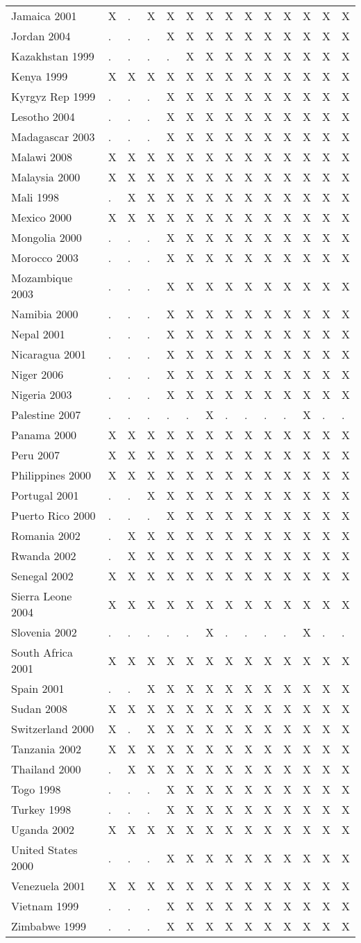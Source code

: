 \documentclass[a4paper]{article}
\begin{document}
\begin{longtable}{llllllllllllll}
Jamaica 2001&X&.&X&X&X&X&X&X&X&X&X&X&X\tabularnewline
Jordan 2004&.&.&.&X&X&X&X&X&X&X&X&X&X\tabularnewline
Kazakhstan 1999&.&.&.&.&X&X&X&X&X&X&X&X&X\tabularnewline
Kenya 1999&X&X&X&X&X&X&X&X&X&X&X&X&X\tabularnewline
Kyrgyz Rep 1999&.&.&.&X&X&X&X&X&X&X&X&X&X\tabularnewline
Lesotho 2004&.&.&.&X&X&X&X&X&X&X&X&X&X\tabularnewline
Madagascar 2003&.&.&.&X&X&X&X&X&X&X&X&X&X\tabularnewline
Malawi 2008&X&X&X&X&X&X&X&X&X&X&X&X&X\tabularnewline
Malaysia 2000&X&X&X&X&X&X&X&X&X&X&X&X&X\tabularnewline
Mali 1998&.&X&X&X&X&X&X&X&X&X&X&X&X\tabularnewline
\newpage
Mexico 2000&X&X&X&X&X&X&X&X&X&X&X&X&X\tabularnewline
Mongolia 2000&.&.&.&X&X&X&X&X&X&X&X&X&X\tabularnewline
Morocco 2003&.&.&.&X&X&X&X&X&X&X&X&X&X\tabularnewline
Mozambique 2003&.&.&.&X&X&X&X&X&X&X&X&X&X\tabularnewline
Namibia 2000&.&.&.&X&X&X&X&X&X&X&X&X&X\tabularnewline
Nepal 2001&.&.&.&X&X&X&X&X&X&X&X&X&X\tabularnewline
Nicaragua 2001&.&.&.&X&X&X&X&X&X&X&X&X&X\tabularnewline
Niger 2006&.&.&.&X&X&X&X&X&X&X&X&X&X\tabularnewline
Nigeria 2003&.&.&.&X&X&X&X&X&X&X&X&X&X\tabularnewline
Palestine 2007&.&.&.&.&.&X&.&.&.&.&X&.&.\tabularnewline
Panama 2000&X&X&X&X&X&X&X&X&X&X&X&X&X\tabularnewline
Peru 2007&X&X&X&X&X&X&X&X&X&X&X&X&X\tabularnewline
Philippines 2000&X&X&X&X&X&X&X&X&X&X&X&X&X\tabularnewline
Portugal 2001&.&.&X&X&X&X&X&X&X&X&X&X&X\tabularnewline
Puerto Rico 2000&.&.&.&X&X&X&X&X&X&X&X&X&X\tabularnewline
Romania 2002&.&X&X&X&X&X&X&X&X&X&X&X&X\tabularnewline
Rwanda 2002&.&X&X&X&X&X&X&X&X&X&X&X&X\tabularnewline
Senegal 2002&X&X&X&X&X&X&X&X&X&X&X&X&X\tabularnewline
Sierra Leone 2004&X&X&X&X&X&X&X&X&X&X&X&X&X\tabularnewline
Slovenia 2002&.&.&.&.&.&X&.&.&.&.&X&.&.\tabularnewline
South Africa 2001&X&X&X&X&X&X&X&X&X&X&X&X&X\tabularnewline
Spain 2001&.&.&X&X&X&X&X&X&X&X&X&X&X\tabularnewline
Sudan 2008&X&X&X&X&X&X&X&X&X&X&X&X&X\tabularnewline
Switzerland 2000&X&.&X&X&X&X&X&X&X&X&X&X&X\tabularnewline
Tanzania 2002&X&X&X&X&X&X&X&X&X&X&X&X&X\tabularnewline
Thailand 2000&.&X&X&X&X&X&X&X&X&X&X&X&X\tabularnewline
Togo 1998&.&.&.&X&X&X&X&X&X&X&X&X&X\tabularnewline
Turkey 1998&.&.&.&X&X&X&X&X&X&X&X&X&X\tabularnewline
Uganda 2002&X&X&X&X&X&X&X&X&X&X&X&X&X\tabularnewline
United States 2000&.&.&.&X&X&X&X&X&X&X&X&X&X\tabularnewline
Venezuela 2001&X&X&X&X&X&X&X&X&X&X&X&X&X\tabularnewline
Vietnam 1999&.&.&.&X&X&X&X&X&X&X&X&X&X\tabularnewline
Zimbabwe 1999&.&.&.&X&X&X&X&X&X&X&X&X&X\tabularnewline
\hline
 \end{longtable}\pagebreak
%

\setlongtables
\end{document}
